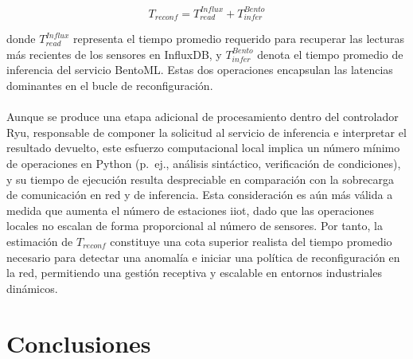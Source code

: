 \begin{equation}
T_{reconf} = T_{read}^{Influx} + T_{infer}^{Bento}
\end{equation}

donde $T_{read}^{Influx}$ representa el tiempo promedio requerido para recuperar las lecturas más recientes de los sensores en InfluxDB, y $T_{infer}^{Bento}$ denota el tiempo promedio de inferencia del servicio BentoML. Estas dos operaciones encapsulan las latencias dominantes en el bucle de reconfiguración. \\
\\
Aunque se produce una etapa adicional de procesamiento dentro del controlador Ryu, responsable de componer la solicitud al servicio de inferencia e interpretar el resultado devuelto, este esfuerzo computacional local implica un número mínimo de operaciones en Python (p.~ej., análisis sintáctico, verificación de condiciones), y su tiempo de ejecución resulta despreciable en comparación con la sobrecarga de comunicación en red y de inferencia. Esta consideración es aún más válida a medida que aumenta el número de estaciones \gls{iiot}, dado que las operaciones locales no escalan de forma proporcional al número de sensores. Por tanto, la estimación de $T_{reconf}$ constituye una cota superior realista del tiempo promedio necesario para detectar una anomalía e iniciar una política de reconfiguración en la red, permitiendo una gestión receptiva y escalable en entornos industriales dinámicos.

\section{Conclusiones}


